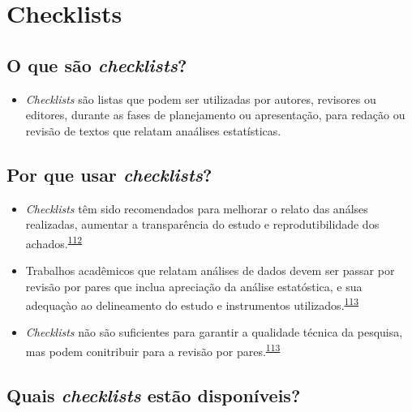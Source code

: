 \documentclass[
]{book}
\providecommand{\tightlist}{%
  \setlength{\itemsep}{0pt}\setlength{\parskip}{0pt}}
\begin{document}
\hypertarget{checklists}{%
\section{Checklists}\label{checklists}}

\hypertarget{o-que-suxe3o-checklists}{%
\subsection{\texorpdfstring{O que são \emph{checklists}?}{O que são checklists?}}\label{o-que-suxe3o-checklists}}

\begin{itemize}
\tightlist
\item
  \emph{Checklists} são listas que podem ser utilizadas por autores, revisores ou editores, durante as fases de planejamento ou apresentação, para redação ou revisão de textos que relatam anaálises estatísticas.
\end{itemize}

\hypertarget{por-que-usar-checklists}{%
\subsection{\texorpdfstring{Por que usar \emph{checklists}?}{Por que usar checklists?}}\label{por-que-usar-checklists}}

\begin{itemize}
\item
  \emph{Checklists} têm sido recomendados para melhorar o relato das análses realizadas, aumentar a transparência do estudo e reprodutibilidade dos achados.\textsuperscript{\protect\hyperlink{ref-Gardner1986}{112}}
\item
  Trabalhos acadêmicos que relatam análises de dados devem ser passar por revisão por pares que inclua apreciação da análise estatóstica, e sua adequaçào ao delineamento do estudo e instrumentos utilizados.\textsuperscript{\protect\hyperlink{ref-Mascha2017}{113}}
\item
  \emph{Checklists} não são suficientes para garantir a qualidade técnica da pesquisa, mas podem conitribuir para a revisão por pares.\textsuperscript{\protect\hyperlink{ref-Mascha2017}{113}}
\end{itemize}

\hypertarget{quais-checklists-estuxe3o-disponuxedveis}{%
\subsection{\texorpdfstring{Quais \emph{checklists} estão disponíveis?}{Quais checklists estão disponíveis?}}\label{quais-checklists-estuxe3o-disponuxedveis}}
\end{document}

